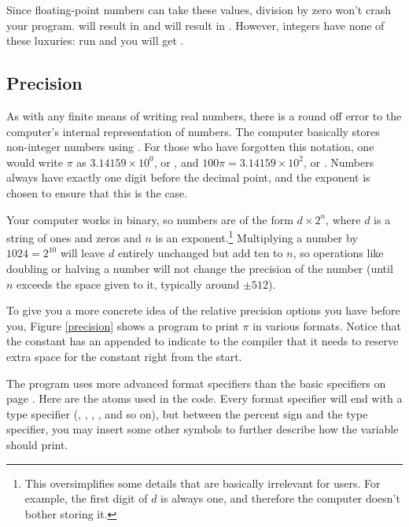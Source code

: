 Since floating-point numbers can take these values, division by zero
won't crash your program.  will result in
 and  will result in . However, integers have none of these luxuries: run  and you will get .

\subsection{Precision} 
As with any finite means of writing real numbers,
there is a round off error to the computer's internal representation of
numbers. The computer basically stores non-integer numbers using
. For those who have forgotten this notation, one
would write  $\pi$ as $3.14159 \times 10^0$, or , 
and $100\pi = 3.14159 \times 10^2$, or . 
Numbers always have exactly one digit before the decimal point, and the
exponent is chosen to ensure that this is the case.

Your computer works in binary, so numbers are of the form $d \times
2^n$, where $d$ is a string of ones and zeros and $n$ is an
exponent.\footnote{This oversimplifies some details that are
basically irrelevant for users. For example, the first digit of $d$
is always one, and therefore the computer doesn't bother storing it.}
Multiplying a number by $1024=2^{10}$ will leave $d$ entirely unchanged
but add ten to $n$, so operations like doubling or halving a number
will not change the precision of the number (until $n$ exceeds the space
given to it, typically around $\pm 512$).

To give you a more concrete idea of the relative precision options
you have before you, Figure \ref{precision} shows a program to print $\pi$ in various
formats. Notice that the constant has an  appended to indicate
to the compiler that it needs to reserve extra space for the constant
right from the start. 

The program uses more advanced format specifiers than the basic specifiers
on page \pageref{printf}. Here are the atoms used in the code.  Every
format specifier will end with a type specifier (, , ,
, and so on), but between the percent sign and the type specifier,
you may insert some other symbols to further describe how the variable
should print.

\begin{center}
\label{printftwo}
\end{center}

